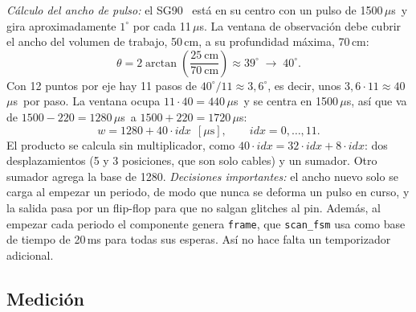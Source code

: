 \documentclass[conference]{IEEEtran}
\newcommand{\mo}[1]{\texttt{#1}}
\newcommand{\us}{\,$\mu$s}
\begin{document}
\emph{Cálculo del ancho de pulso:} el SG90~\cite{sg90} está en su centro con un pulso de 1500\us\ y gira aproximadamente $1^\circ$ por cada 11\us. La ventana de observación debe cubrir el ancho del volumen de trabajo, 50\,cm, a su profundidad máxima, 70\,cm:
\begin{equation}
\theta = 2\arctan\!\left(\frac{25\ \text{cm}}{70\ \text{cm}}\right) \approx 39^\circ \;\rightarrow\; 40^\circ .
\end{equation}
Con 12 puntos por eje hay 11 pasos de $40^\circ/11 \approx 3{,}6^\circ$, es decir, unos $3{,}6 \cdot 11 \approx 40$\us\ por paso. La ventana ocupa $11 \cdot 40 = 440$\us\ y se centra en 1500\us, así que va de $1500 - 220 = 1280$\us\ a $1500 + 220 = 1720$\us:
\begin{equation}
w = 1280 + 40\cdot \mathit{idx}\ \ [\mu\text{s}], \qquad \mathit{idx} = 0,\ldots,11 .
\end{equation}
El producto se calcula sin multiplicador, como $40\cdot\mathit{idx} = 32\cdot\mathit{idx} + 8\cdot\mathit{idx}$: dos desplazamientos (5 y 3 posiciones, que son solo cables) y un sumador. Otro sumador agrega la base de 1280.
\emph{Decisiones importantes:} el ancho nuevo solo se carga al empezar un periodo, de modo que nunca se deforma un pulso en curso, y la salida pasa por un flip-flop para que no salgan glitches al pin. Además, al empezar cada periodo el componente genera \mo{frame}, que \mo{scan\_fsm} usa como base de tiempo de 20\,ms para todas sus esperas. Así no hace falta un temporizador adicional.

\subsection{Medición}
\end{document}

